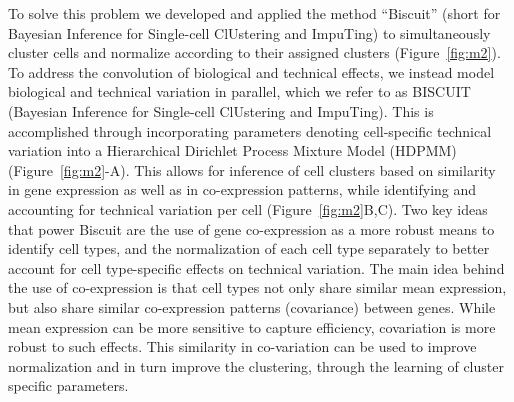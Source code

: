 To solve this problem we developed and applied the method ``Biscuit'' (short for Bayesian Inference for Single-cell ClUstering and ImpuTing) to simultaneously cluster cells and normalize according to their assigned clusters \citep{Prabhakaran2016} (Figure~\ref{fig:m2}).
To address the convolution of biological and technical effects, we instead model biological and technical variation in parallel, which we refer to as BISCUIT (Bayesian Inference for Single-cell ClUstering and ImpuTing).
This is accomplished through incorporating parameters denoting cell-specific technical variation into a Hierarchical Dirichlet Process Mixture Model (HDPMM) \citep{Goeruer2010} (Figure~\ref{fig:m2}-A). 
This allows for inference of cell clusters based on similarity in gene expression as well as in co-expression patterns, while identifying and accounting for technical variation per cell (Figure~\ref{fig:m2}B,C). 
Two key ideas that power Biscuit are the use of gene co-expression as a more robust means to identify cell types, and the normalization of each cell type separately to better account for cell type-specific effects on technical variation. 
The main idea behind the use of co-expression is that cell types not only share similar mean expression, but also share similar co-expression patterns (covariance) between genes. 
While mean expression can be more sensitive to capture efficiency, covariation is more robust to such effects. 
This similarity in co-variation can be used to improve normalization and in turn improve the clustering, through the learning of cluster specific parameters.

